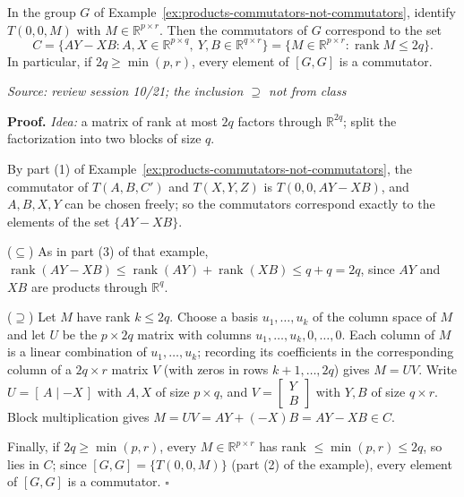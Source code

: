 \documentclass[11pt]{report}
\renewenvironment{proof}[1][Proof]{\noindent\textbf{#1.} }{\hfill$\square$\par\vspace{5pt}}
\newcommand{\srcline}[1]{\par\hfill{\footnotesize\textit{Source: #1}}}
\begin{document}
\begin{propbox}\label{prop:block-group-commutators-rank}
In the group $G$ of Example~\ref{ex:products-commutators-not-commutators}, identify $T(0, 0, M)$ with $M \in \mathbb{R}^{p \times r}$. Then the commutators of $G$ correspond to the set
\[ C = \{AY - XB : A, X \in \mathbb{R}^{p \times q},\ Y, B \in \mathbb{R}^{q \times r}\} = \{M \in \mathbb{R}^{p \times r} : \operatorname{rank} M \leq 2q\}. \]
In particular, if $2q \geq \min(p, r)$, every element of $[G, G]$ is a commutator.
\srcline{review session 10/21; the inclusion $\supseteq$ not from class}
\end{propbox}

\begin{proof}
\textit{Idea:} a matrix of rank at most $2q$ factors through $\mathbb{R}^{2q}$; split the factorization into two blocks of size $q$.\par
By part (1) of Example~\ref{ex:products-commutators-not-commutators}, the commutator of $T(A, B, C')$ and $T(X, Y, Z)$ is $T(0, 0, AY - XB)$, and $A, B, X, Y$ can be chosen freely; so the commutators correspond exactly to the elements of the set $\{AY - XB\}$.

($\subseteq$) As in part (3) of that example, $\operatorname{rank}(AY - XB) \leq \operatorname{rank}(AY) + \operatorname{rank}(XB) \leq q + q = 2q$, since $AY$ and $XB$ are products through $\mathbb{R}^q$.

($\supseteq$) Let $M$ have rank $k \leq 2q$. Choose a basis $u_1, \ldots, u_k$ of the column space of $M$ and let $U$ be the $p \times 2q$ matrix with columns $u_1, \ldots, u_k, 0, \ldots, 0$. Each column of $M$ is a linear combination of $u_1, \ldots, u_k$; recording its coefficients in the corresponding column of a $2q \times r$ matrix $V$ (with zeros in rows $k+1, \ldots, 2q$) gives $M = UV$. Write $U = [\,A \mid -X\,]$ with $A, X$ of size $p \times q$, and $V = \begin{bmatrix} Y \\ B \end{bmatrix}$ with $Y, B$ of size $q \times r$. Block multiplication gives $M = UV = AY + (-X)B = AY - XB \in C$.

Finally, if $2q \geq \min(p, r)$, every $M \in \mathbb{R}^{p \times r}$ has rank $\leq \min(p, r) \leq 2q$, so lies in $C$; since $[G, G] = \{T(0, 0, M)\}$ (part (2) of the example), every element of $[G, G]$ is a commutator.
\end{proof}
\end{document}
